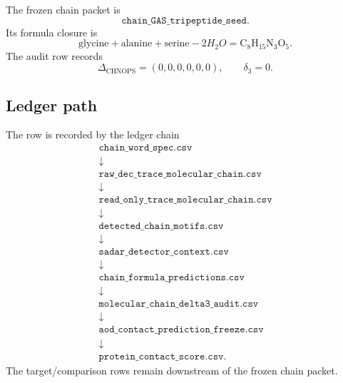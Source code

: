 The frozen chain packet is
\[
\texttt{chain\_GAS\_tripeptide\_seed}.
\]
Its formula closure is
\[
\mathrm{glycine}+\mathrm{alanine}+\mathrm{serine}-2H_2O
=\mathrm{C}_8\mathrm{H}_{15}\mathrm{N}_3\mathrm{O}_5.
\]
The audit row records
\[
\Delta_{\mathrm{CHNOPS}}=(0,0,0,0,0,0),
\qquad
\delta_3=0.
\]

\subsection{Ledger path}

The row is recorded by the ledger chain
\[
\begin{array}{c}
\texttt{chain\_word\_spec.csv}\\
\downarrow\\
\texttt{raw\_dec\_trace\_molecular\_chain.csv}\\
\downarrow\\
\texttt{read\_only\_trace\_molecular\_chain.csv}\\
\downarrow\\
\texttt{detected\_chain\_motifs.csv}\\
\downarrow\\
\texttt{sadar\_detector\_context.csv}\\
\downarrow\\
\texttt{chain\_formula\_predictions.csv}\\
\downarrow\\
\texttt{molecular\_chain\_delta3\_audit.csv}\\
\downarrow\\
\texttt{aod\_contact\_prediction\_freeze.csv}\\
\downarrow\\
\texttt{protein\_contact\_score.csv}.
\end{array}
\]
The target/comparison rows remain downstream of the frozen chain packet.
